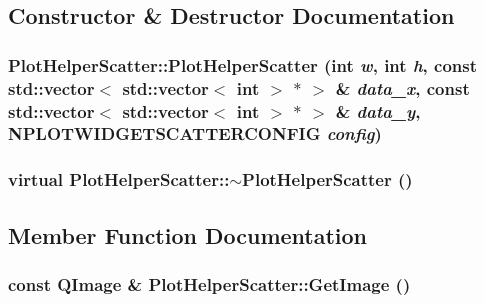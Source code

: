 \subsection{Constructor \& Destructor Documentation}
\hypertarget{class_plot_helper_scatter_558bfa538ebb079e81ffad5d0d2d1cee}{
\subsubsection[{PlotHelperScatter}]{\setlength{\rightskip}{0pt plus 5cm}PlotHelperScatter::PlotHelperScatter (int {\em w}, \/  int {\em h}, \/  const std::vector$<$ std::vector$<$ int $>$ $\ast$ $>$ \& {\em data\_\-x}, \/  const std::vector$<$ std::vector$<$ int $>$ $\ast$ $>$ \& {\em data\_\-y}, \/  NPLOTWIDGETSCATTERCONFIG {\em config})}}
\label{class_plot_helper_scatter_558bfa538ebb079e81ffad5d0d2d1cee}


\hypertarget{class_plot_helper_scatter_58ec927ca542928a504050a7f36ce70c}{
\subsubsection[{$\sim$PlotHelperScatter}]{\setlength{\rightskip}{0pt plus 5cm}virtual PlotHelperScatter::$\sim$PlotHelperScatter ()}}
\label{class_plot_helper_scatter_58ec927ca542928a504050a7f36ce70c}




\subsection{Member Function Documentation}
\hypertarget{class_plot_helper_scatter_0752a8d97f16327f14a63554ddf79c3a}{
\subsubsection[{GetImage}]{\setlength{\rightskip}{0pt plus 5cm}const QImage \& PlotHelperScatter::GetImage ()}}
\label{class_plot_helper_scatter_0752a8d97f16327f14a63554ddf79c3a}




